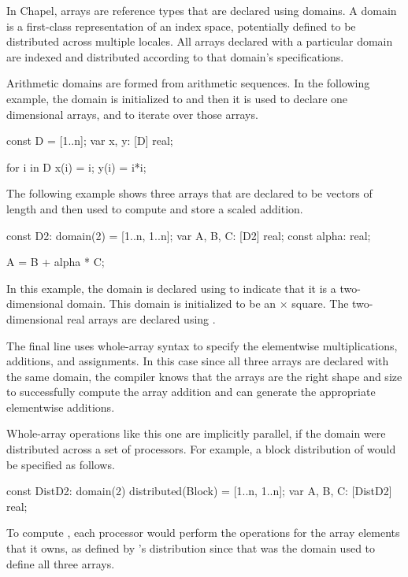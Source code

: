 In Chapel, arrays are reference types that are declared using domains.
A domain is a first-class representation of an index space, potentially 
defined to be distributed across multiple locales.   All arrays
declared with a particular domain are indexed and distributed according 
to that domain's specifications.  

Arithmetic domains are formed from arithmetic sequences.  In the following
example, the domain  is initialized to  and then it is
used to declare one dimensional arrays, and to iterate over those arrays.
\begin{chapel}
const D = [1..n];
var x, y: [D] real;

for i in D {
  x(i) = i;
  y(i) = i*i;
}
\end{chapel}

The following example shows three arrays that are declared to be
vectors of length  and then used to compute and store a 
scaled addition.
\begin{chapel}
const D2: domain(2) = [1..n, 1..n];
var A, B, C: [D2] real;
const alpha: real;

A = B + alpha * C;
\end{chapel}
In this example, the domain  is declared using  
 to indicate that it is a two-dimensional domain.
This domain is initialized to be an  $\times$ 
square.  The two-dimensional real arrays  are declared using
.

The final line uses whole-array syntax to specify the elementwise 
multiplications, additions, and assignments.  In this case since
all three arrays are declared with the same domain, the compiler
knows that the arrays are the right shape and size to successfully
compute the array addition and can generate the appropriate elementwise
additions.

Whole-array operations like this one are implicitly parallel, if the 
domain were distributed across a set of processors.  For example, 
a block distribution of  would be specified as follows.    
\begin{chapel}
const DistD2: domain(2) distributed(Block) = [1..n, 1..n];
var A, B, C: [DistD2] real;
\end{chapel}
To compute , each processor would perform the 
operations for the array elements that it owns, 
as defined by 's distribution since that was the domain
used to define all three arrays.

